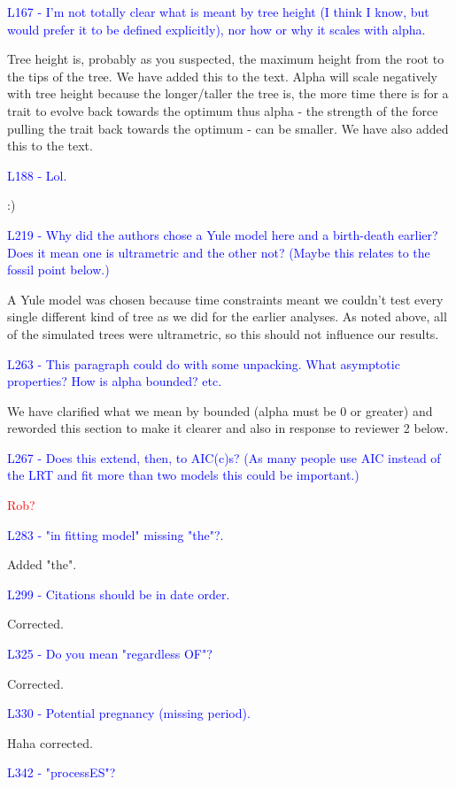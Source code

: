 \documentclass[12pt]{letter}
\begin{document}
\begin{letter}{}
\textcolor{blue}{L167 - I'm not totally clear what is meant by tree height (I think I know, but would prefer it to be defined explicitly), nor how or why it scales with alpha.}

Tree height is, probably as you suspected, the maximum height from the root to the tips of the tree. We have added this to the text. Alpha will scale negatively with tree height because the longer/taller the tree is, the more time there is for a trait to evolve back towards the optimum thus alpha - the strength of the force pulling the trait back towards the optimum - can be smaller. We have also added this to the text.

\textcolor{blue}{L188 - Lol.}

:)

\textcolor{blue}{L219 - Why did the authors chose a Yule model here and a birth-death earlier? Does it mean one is ultrametric and the other not? (Maybe this relates to the fossil point below.)}

A Yule model was chosen because time constraints meant we couldn't test every single different kind of tree as we did for the earlier analyses. As noted above, all of the simulated trees were ultrametric, so this should not influence our results. 

\textcolor{blue}{L263 - This paragraph could do with some unpacking. What asymptotic properties? How is alpha bounded? etc.}

We have clarified what we mean by bounded (alpha must be 0 or greater) and reworded this section to make it clearer and also in response to reviewer 2 below.

\textcolor{blue}{L267 - Does this extend, then, to AIC(c)s? (As many people use AIC instead of the LRT and fit more than two models this could be important.)}

\textcolor{red}{Rob?}

\textcolor{blue}{L283 - "in fitting model" missing "the"?.}

Added "the".

\textcolor{blue}{L299 - Citations should be in date order.}

Corrected.

\textcolor{blue}{L325 - Do you mean "regardless OF"?}

Corrected.

\textcolor{blue}{L330 - Potential pregnancy (missing period).}

Haha corrected.

\textcolor{blue}{L342 - "processES"?}


\end{letter}
\end{document}
